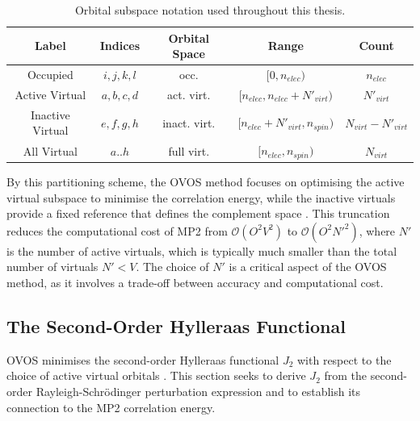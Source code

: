 \begin{table}[ht]
    \centering
    \begin{tabular}{|c|c|c|c|c|}
        \hline
        Label & Indices & Orbital Space & Range & Count \\
        \hline
        Occupied & $i,j,k,l$ & occ. & $[0, n_{elec})$ & $n_{elec}$ \\
        Active Virtual & $a,b,c,d$ & act. virt. & $[n_{elec}, n_{elec}+N'_{virt})$ & $N'_{virt}$ \\
        Inactive Virtual & $e,f,g,h$ & inact. virt. & $[n_{elec}+N'_{virt}, n_{spin})$ & $N_{virt}-N'_{virt}$ \\
        All Virtual & $a..h$ & full virt. & $[n_{elec}, n_{spin})$ & $N_{virt}$ \\
        \hline
    \end{tabular}
    \caption{Orbital subspace notation used throughout this thesis.}
    \label{tab:index_notation}
\end{table}

By this partitioning scheme, the OVOS method focuses on optimising the active virtual subspace to minimise the correlation energy, while the inactive virtuals provide a fixed reference that defines the complement space \cite{Adamowicz1987}. This truncation reduces the computational cost of MP2 from $\mathcal{O}(O^2V^2)$ to $\mathcal{O}(O^2N'^2)$, where $N'$ is the number of active virtuals, which is typically much smaller than the total number of virtuals $N'<V$. The choice of $N'$ is a critical aspect of the OVOS method, as it involves a trade-off between accuracy and computational cost.




\subsection{The Second-Order Hylleraas Functional}
\label{subsec:2nd_hylleraas}

OVOS minimises the second-order Hylleraas functional $J_2$ with respect to the choice of active virtual orbitals \cite{Adamowicz1987}. This section seeks to derive $J_2$ from the second-order Rayleigh-Schrödinger perturbation expression and to establish its connection to the MP2 correlation energy.


